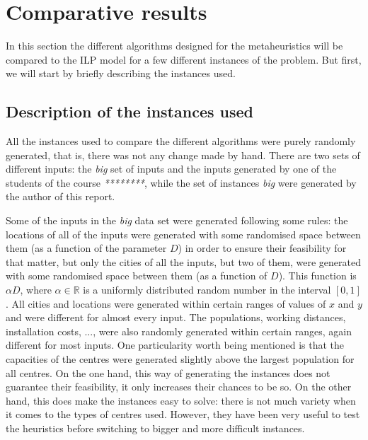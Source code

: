 \section{Comparative results}
\label{sec:comparative-results}

In this section the different algorithms designed for the metaheuristics will be compared to
the ILP model for a few different instances of the problem. But first, we will start by
briefly describing the instances used.

\subsection{Description of the instances used}
\label{sec:comparative-results:instances}

All the instances used to compare the different algorithms were purely randomly generated,
that is, there was not any change made by hand. There are two sets of different inputs: the
\textit{big} set of inputs and the inputs generated by one of the students of the course
\textit{********}, while the set of instances \textit{big} were generated by the author
of this report.

\hfill

Some of the inputs in the \textit{big} data set were generated following some rules: the
locations of all of the inputs were generated with some randomised space between them (as a
function of the parameter $D$) in order to ensure their feasibility for that matter, but only
the cities of all the inputs, but two of them, were generated with some randomised space
between them (as a function of $D$). This function is $\alpha D$, where $\alpha \in \mathbb{R}$
is a uniformly distributed random number in the interval $[0,1]$. All cities and locations
were generated within certain ranges of values of $x$ and $y$ and were different for almost
every input. The populations, working distances, installation costs, ..., were also randomly
generated within certain ranges, again different for most inputs. One particularity worth being
mentioned is that the capacities of the centres were generated slightly above the largest
population for all centres. On the one hand, this way of generating the instances does not
guarantee their feasibility, it only increases their chances to be so. On the other hand, this
does make the instances easy to solve: there is not much variety when it comes to the types of
centres used. However, they have been very useful to test the heuristics before switching to
bigger and more difficult instances.

